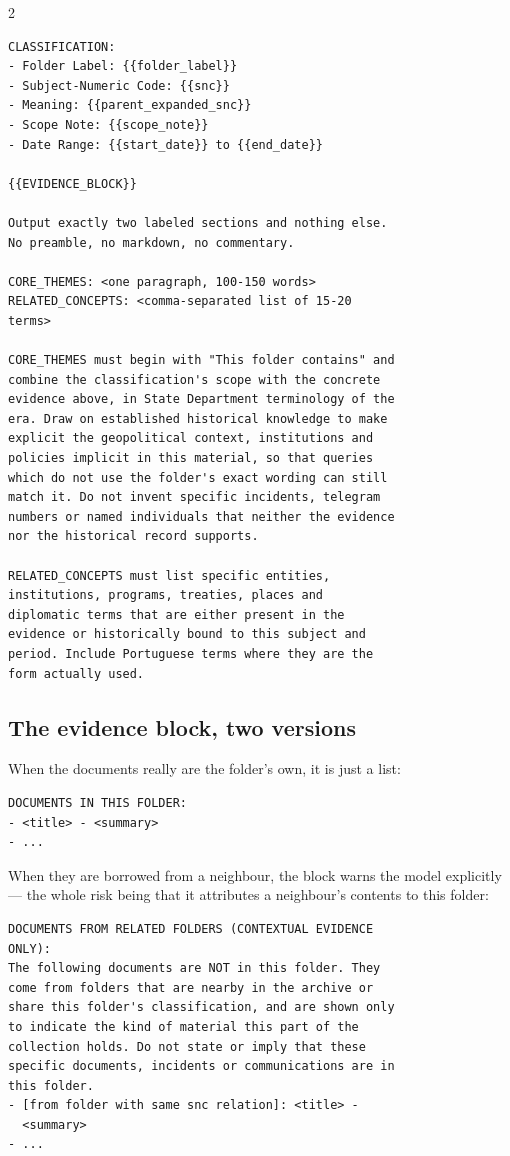 \documentclass[a4paper,11pt]{article}
\begin{document}
\begin{multicols}{2}
{\begin{verbatim}
CLASSIFICATION:
- Folder Label: {{folder_label}}
- Subject-Numeric Code: {{snc}}
- Meaning: {{parent_expanded_snc}}
- Scope Note: {{scope_note}}
- Date Range: {{start_date}} to {{end_date}}

{{EVIDENCE_BLOCK}}

Output exactly two labeled sections and nothing else.
No preamble, no markdown, no commentary.

CORE_THEMES: <one paragraph, 100-150 words>
RELATED_CONCEPTS: <comma-separated list of 15-20
terms>

CORE_THEMES must begin with "This folder contains" and
combine the classification's scope with the concrete
evidence above, in State Department terminology of the
era. Draw on established historical knowledge to make
explicit the geopolitical context, institutions and
policies implicit in this material, so that queries
which do not use the folder's exact wording can still
match it. Do not invent specific incidents, telegram
numbers or named individuals that neither the evidence
nor the historical record supports.

RELATED_CONCEPTS must list specific entities,
institutions, programs, treaties, places and
diplomatic terms that are either present in the
evidence or historically bound to this subject and
period. Include Portuguese terms where they are the
form actually used.
\end{verbatim}
}

\subsection*{The evidence block, two versions}

When the documents really are the folder's own, it is just a list:

{\scriptsize
\begin{verbatim}
DOCUMENTS IN THIS FOLDER:
- <title> - <summary>
- ...
\end{verbatim}
}

When they are borrowed from a neighbour, the block warns the model explicitly --- the whole
risk being that it attributes a neighbour's contents to this folder:

{\scriptsize
\begin{verbatim}
DOCUMENTS FROM RELATED FOLDERS (CONTEXTUAL EVIDENCE
ONLY):
The following documents are NOT in this folder. They
come from folders that are nearby in the archive or
share this folder's classification, and are shown only
to indicate the kind of material this part of the
collection holds. Do not state or imply that these
specific documents, incidents or communications are in
this folder.
- [from folder with same snc relation]: <title> -
  <summary>
- ...
\end{verbatim}
}


\end{multicols}
\end{document}
